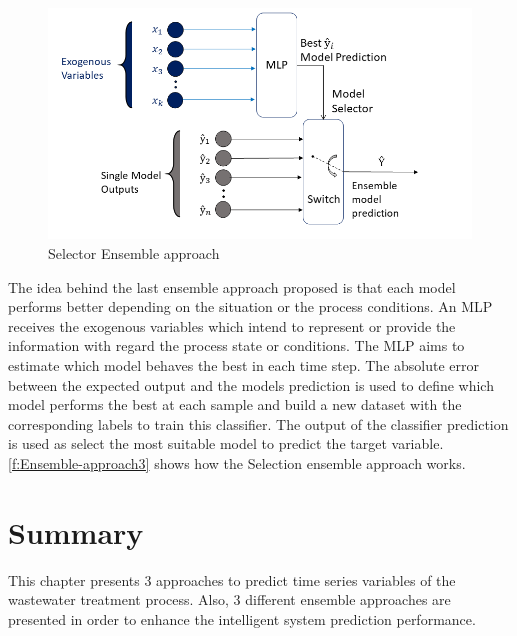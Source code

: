 \begin{figure}[h]
\centering
\includegraphics[width=\linewidth]{figures/Ch4/Ensemble_Approach3.png}
\caption{Selector Ensemble approach}
\label{f:Ensemble-approach3}
\end{figure}

The idea behind the last ensemble approach proposed is that each model performs better depending on the situation or the process conditions. An \ac{MLP} receives the exogenous variables which intend to represent or provide the information with regard the process state or conditions. The \ac{MLP} aims to estimate which model behaves the best in each time step. The absolute error between the expected output and the models prediction is used to define which model performs the best at each sample and build a new dataset with the corresponding labels to train this classifier. 
The output of the classifier prediction is used as select the most suitable model to predict the target variable. \autoref{f:Ensemble-approach3} shows how the Selection ensemble approach works.


\section{Summary}

\label{s:Contribution-1-Summary}

This chapter presents 3 approaches to predict time series variables of the wastewater treatment process. Also, 3 different ensemble approaches are presented in order to enhance the intelligent system prediction performance.